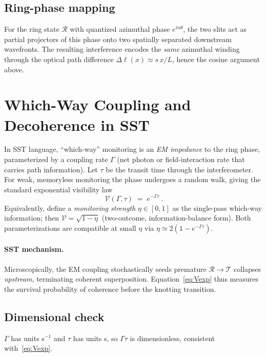 \documentclass[11pt,a4paper]{article}
\begin{document}


\subsection{Ring-phase mapping}
    For the ring state $\mathcal R$ with quantized azimuthal phase $e^{i n\theta}$, the two slits act as partial projectors of this phase onto two spatially separated downstream wavefronts. The resulting interference encodes the \emph{same} azimuthal winding through the optical path difference $\Delta \ell(x) \approx s\,x/L$, hence the cosine argument above.

\section{Which-Way Coupling and Decoherence in SST}

In SST language, ``which-way'' monitoring is an \emph{EM impedance} to the ring phase, parameterized by a coupling rate $\Gamma$ (net photon or field-interaction rate that carries path information).
Let $\tau$ be the transit time through the interferometer.
For weak, memoryless monitoring the phase undergoes a random walk, giving the standard exponential visibility law~\cite{Zurek2003}
\begin{equation}
\boxed{\ \mathcal V(\Gamma,\tau) \;=\; e^{-\Gamma \tau}\ }. \label{eq:Vexp}
\end{equation}
Equivalently, define a \emph{monitoring strength} $\eta\in[0,1]$ as the single-pass which-way information; then $\mathcal V=\sqrt{1-\eta}$ (two-outcome, information-balance form). Both parameterizations are compatible at small $\eta$ via $\eta\simeq 2(1-e^{-\Gamma\tau})$.

\paragraph{SST mechanism.}
    Microscopically, the EM coupling stochastically seeds premature $\mathcal R\!\to\!\mathcal T$ collapses \emph{upstream}, terminating coherent superposition.
    Equation~\eqref{eq:Vexp} thus measures the survival probability of coherence before the knotting transition.

\subsection{Dimensional check}
$\Gamma$ has units s$^{-1}$ and $\tau$ has units s, so $\Gamma\tau$ is dimensionless, consistent with~\eqref{eq:Vexp}.
\end{document}
